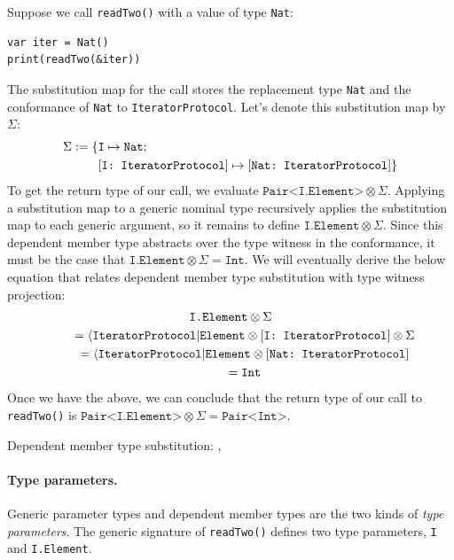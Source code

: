 \documentclass[../generics]{subfiles}
\begin{document}
Suppose we call \verb|readTwo()| with a value of type \texttt{Nat}:
\begin{Verbatim}
var iter = Nat()
print(readTwo(&iter))
\end{Verbatim}
The substitution map for the call stores the replacement type \texttt{Nat} and the conformance of \texttt{Nat} to \texttt{IteratorProtocol}. Let's denote this substitution map by~$\Sigma$:
\begin{align*}
\Sigma := \{&\texttt{I} \mapsto \texttt{Nat};\,\\
&[\texttt{I:~IteratorProtocol}] \mapsto [\texttt{Nat:~IteratorProtocol}]\}
\end{align*}
To get the return type of our call, we evaluate $\texttt{Pair<I.Element>}\otimes\Sigma$. Applying a substitution map to a generic nominal type recursively applies the substitution map to each generic argument, so it remains to define $\texttt{I.Element}\otimes\Sigma$. Since this dependent member type abstracts over the type witness in the conformance, it must be the case that $\texttt{I.Element}\otimes\Sigma=\texttt{Int}$. We will eventually derive the below equation that relates dependent member type substitution with type witness projection:
\begin{gather*}
\texttt{I.Element}\otimes\Sigma\\
\qquad {} = \langle\texttt{IteratorProtocol}|\texttt{Element}\otimes [\texttt{I:~IteratorProtocol}]\otimes\Sigma\\
\qquad {} = \langle\texttt{IteratorProtocol}|\texttt{Element}\otimes [\texttt{Nat:~IteratorProtocol}]\\
\qquad {} = \texttt{Int}
\end{gather*}
Once we have the above, we can conclude that the return type of our call to \verb|readTwo()| is $\texttt{Pair<I.Element>}\otimes\Sigma=\texttt{Pair<Int>}$.

\begin{MoreDetails}
\item Dependent member type substitution: , 
\end{MoreDetails}

\paragraph{Type parameters.} Generic parameter types and dependent member types are the two kinds of \emph{type parameters}. The generic signature of \verb|readTwo()| defines two type parameters, \texttt{I} and \texttt{I.Element}.
\end{document}
